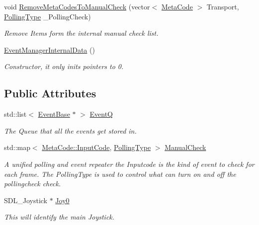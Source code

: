 \begin{DoxyCompactItemize}
void \hyperlink{structphys_1_1internal_1_1EventManagerInternalData_a54babcae1822814f09beace684f97e72}{RemoveMetaCodesToManualCheck} (vector$<$ \hyperlink{classphys_1_1MetaCode}{MetaCode} $>$ Transport, \hyperlink{structphys_1_1internal_1_1EventManagerInternalData_ab9ab8380b84448aacf46a63050e159af}{PollingType} \_\-PollingCheck)
\begin{DoxyCompactList}\small\item\em Remove Items form the internal manual check list. \item\end{DoxyCompactList}\item 
\hyperlink{structphys_1_1internal_1_1EventManagerInternalData_a2bc6e8af4992cc8b4935f4e5b32b32a0}{EventManagerInternalData} ()
\begin{DoxyCompactList}\small\item\em Constructor, it only inits pointers to 0. \item\end{DoxyCompactList}\end{DoxyCompactItemize}
\subsection*{Public Attributes}
\begin{DoxyCompactItemize}
\item 
std::list$<$ \hyperlink{classphys_1_1EventBase}{EventBase} $\ast$ $>$ \hyperlink{structphys_1_1internal_1_1EventManagerInternalData_a2a3389f3831cae8ded6dd0a3b6395a68}{EventQ}
\begin{DoxyCompactList}\small\item\em The Queue that all the events get stored in. \item\end{DoxyCompactList}\item 
std::map$<$ \hyperlink{classphys_1_1MetaCode_a3e501cbb5bf0f6f1fdb7211465bda8d8}{MetaCode::InputCode}, \hyperlink{structphys_1_1internal_1_1EventManagerInternalData_ab9ab8380b84448aacf46a63050e159af}{PollingType} $>$ \hyperlink{structphys_1_1internal_1_1EventManagerInternalData_a717396b1782d7f491e0f085643507639}{ManualCheck}
\begin{DoxyCompactList}\small\item\em A unified polling and event repeater the Inputcode is the kind of event to check for each frame. The PollingType is used to control what can turn on and off the pollingcheck check. \item\end{DoxyCompactList}\item 
SDL\_\-Joystick $\ast$ \hyperlink{structphys_1_1internal_1_1EventManagerInternalData_aafd32b9b23cb2121bd268e3c56a3f46e}{Joy0}
\begin{DoxyCompactList}\small\item\em This will identify the main Joystick. \item\end{DoxyCompactList}\end{DoxyCompactItemize}


